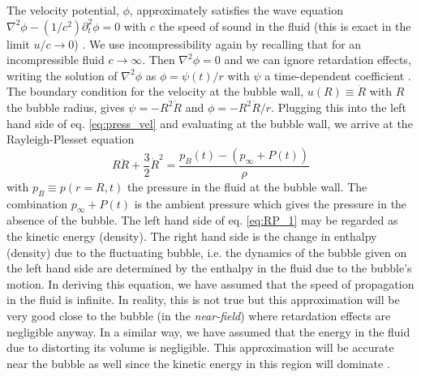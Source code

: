 \documentclass[11pt,prb,aps,nofootinbib,superscriptaddress,floatfix]{revtex4-2}
\begin{document}
The velocity potential, $\phi$, approximately satisfies the wave equation $\nabla^2 \phi - (1/c^2)\partial_t^2 \phi =0 $ with $c$ the speed of sound in the fluid (this is exact in the limit $u/c\rightarrow 0$) \cite{leighton2007derivation,brenner2002single,prosperetti1999old}. We use incompressibility again by recalling that for an incompressible fluid $c\rightarrow \infty$. Then $\nabla^2 \phi =0$ and we can ignore retardation effects, writing the solution of $\nabla^2 \phi$ as $\phi = \psi(t)/r$ with $\psi$ a time-dependent coefficient \cite{prosperetti1999old,prosperetti1986bubble,leighton2007derivation}. The boundary condition for the velocity at the bubble wall, $u(R)\equiv \dot{R}$ with $R$ the bubble radius, gives $\psi= -R^2 \dot{R}$ and $\phi = -R^2 \dot{R}/r$. Plugging this into the left hand side of eq. \ref{eq:press_vel} and evaluating at the bubble wall, we arrive at the Rayleigh-Plesset equation \cite{prosperetti1999old,prosperetti1986bubble,leighton2007derivation,plesset1949dynamics,plesset1977bubble}
\begin{equation}
    R\ddot{R}+\frac{3}{2}\dot{R}^2 = \frac{p_B(t)-(p_\infty+P(t))}{\rho}
    \label{eq:RP_1}
\end{equation}
with $p_B \equiv p(r=R,t)$ the pressure in the fluid at the bubble wall. The combination $p_\infty+P(t)$ is the ambient pressure \cite{prosperetti1999old,prosperetti1986bubble} which gives the pressure in the absence of the bubble. The left hand side of eq. \ref{eq:RP_1} may be regarded as the kinetic energy (density). The right hand side is the change in enthalpy (density) due to the fluctuating bubble, i.e. the dynamics of the bubble given on the left hand side are determined by the enthalpy in the fluid due to the bubble's motion. In deriving this equation, we have assumed that the speed of propagation in the fluid is infinite. In reality, this is not true but this approximation will be very good close to the bubble (in the \emph{near-field}) where retardation effects are negligible anyway. In a similar way, we have assumed that the energy in the fluid due to distorting its volume is negligible. This approximation will be accurate near the bubble as well since the kinetic energy in this region will dominate \cite{prosperetti1999old}.
\end{document}
